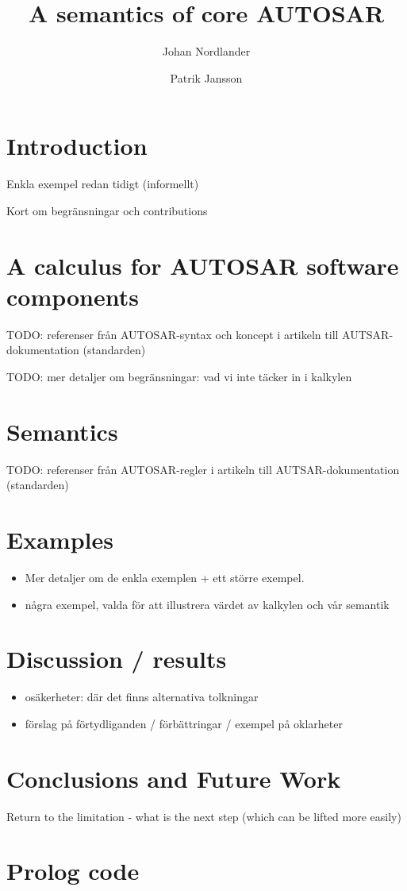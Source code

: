 \documentclass[twocolumn]{article}
\title{A semantics of core AUTOSAR}
\author{Johan Nordlander \and Patrik Jansson}
\begin{document}
\maketitle
\begin{abstract}
  
\end{abstract}

\section{Introduction}
\label{sec:Intro}

Enkla exempel redan tidigt (informellt)

Kort om begränsningar och contributions

\section{A calculus for AUTOSAR software components}
\label{sec:Calc}

TODO: referenser från AUTOSAR-syntax och koncept i artikeln till AUTSAR-dokumentation (standarden)

TODO: mer detaljer om begränsningar: vad vi inte täcker in i kalkylen

\section{Semantics}
\label{sec:Sem}

TODO: referenser från AUTOSAR-regler i artikeln till AUTSAR-dokumentation (standarden)

\section{Examples}
\label{sec:Examples}

\begin{itemize}
\item Mer detaljer om de enkla exemplen + ett större exempel.
\item några exempel, valda för att illustrera värdet av kalkylen och vår semantik
\end{itemize}

\section{Discussion / results}
\label{sec:Disc}

\begin{itemize}
\item osäkerheter: där det finns alternativa tolkningar
\item förslag på förtydliganden / förbättringar / exempel på oklarheter
\end{itemize}

\section{Conclusions and Future Work}
\label{sec:Conc}

Return to the limitation - what is the next step (which can be lifted more easily) 

\onecolumn
\appendix
\section{Prolog code}
\label{sec:Prolog}


\end{document}
